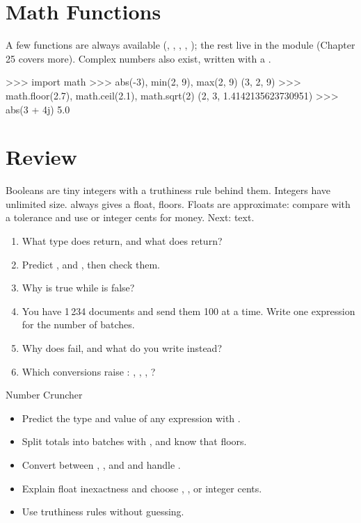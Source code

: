 \section{Math Functions}

A few functions are always available (, , , , ); the rest
live in the  module (Chapter 25 covers more). Complex numbers also exist, written with a .

\begin{pycode}
>>> import math
>>> abs(-3), min(2, 9), max(2, 9)
(3, 2, 9)
>>> math.floor(2.7), math.ceil(2.1), math.sqrt(2)
(2, 3, 1.4142135623730951)
>>> abs(3 + 4j)
5.0
\end{pycode}

\section{Review}

Booleans are tiny integers with a truthiness rule behind them. Integers have unlimited size.
\code{/} always gives a float, \code{//} floors. Floats are approximate: compare with a tolerance
and use  or integer cents for money. Next: text.

\begin{practice}
\begin{enumerate}[itemsep=1pt]
\item What type does  return, and what does  return?
\item Predict ,  and , then check them.
\item Why is  true while  is false?
\item You have 1\,234 documents and send them 100 at a time. Write one expression for the number of batches.
\item Why does  fail, and what do you write instead?
\item Which conversions raise : , , , ?
\end{enumerate}
\end{practice}

\begin{achievement}{Number Cruncher}
\begin{itemize}[itemsep=1pt]
\item Predict the type and value of any expression with \code{+ - * / // \% **}.
\item Split totals into batches with , and know that \code{//} floors.
\item Convert between , ,  and  and handle .
\item Explain float inexactness and choose , ,  or integer cents.
\item Use truthiness rules without guessing.
\end{itemize}
\end{achievement}
